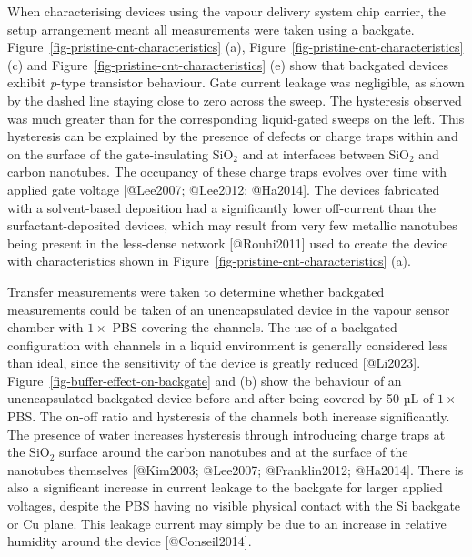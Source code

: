\documentclass[
  letterpaper,
  DIV=11,
  numbers=noendperiod]{scrartcl}
\begin{document}
When characterising devices using the vapour delivery system chip
carrier, the setup arrangement meant all measurements were taken using a
backgate. Figure~\ref{fig-pristine-cnt-characteristics} (a),
Figure~\ref{fig-pristine-cnt-characteristics} (c) and
Figure~\ref{fig-pristine-cnt-characteristics} (e) show that backgated
devices exhibit \emph{p}-type transistor behaviour. Gate current leakage
was negligible, as shown by the dashed line staying close to zero across
the sweep. The hysteresis observed was much greater than for the
corresponding liquid-gated sweeps on the left. This hysteresis can be
explained by the presence of defects or charge traps within and on the
surface of the gate-insulating SiO\(_2\) and at interfaces between
SiO\(_2\) and carbon nanotubes. The occupancy of these charge traps
evolves over time with applied gate voltage {[}@Lee2007; @Lee2012;
@Ha2014{]}. The devices fabricated with a solvent-based deposition had a
significantly lower off-current than the surfactant-deposited devices,
which may result from very few metallic nanotubes being present in the
less-dense network {[}@Rouhi2011{]} used to create the device with
characteristics shown in Figure~\ref{fig-pristine-cnt-characteristics}
(a).

Transfer measurements were taken to determine whether backgated
measurements could be taken of an unencapsulated device in the vapour
sensor chamber with \(1 \times\) PBS covering the channels. The use of a
backgated configuration with channels in a liquid environment is
generally considered less than ideal, since the sensitivity of the
device is greatly reduced {[}@Li2023{]}.
Figure~\ref{fig-buffer-effect-on-backgate} and (b) show the behaviour of
an unencapsulated backgated device before and after being covered by 50
µL of \(1 \times\) PBS. The on-off ratio and hysteresis of the channels
both increase significantly. The presence of water increases hysteresis
through introducing charge traps at the SiO\(_2\) surface around the
carbon nanotubes and at the surface of the nanotubes themselves
{[}@Kim2003; @Lee2007; @Franklin2012; @Ha2014{]}. There is also a
significant increase in current leakage to the backgate for larger
applied voltages, despite the PBS having no visible physical contact
with the Si backgate or Cu plane. This leakage current may simply be due
to an increase in relative humidity around the device
{[}@Conseil2014{]}.
\end{document}
